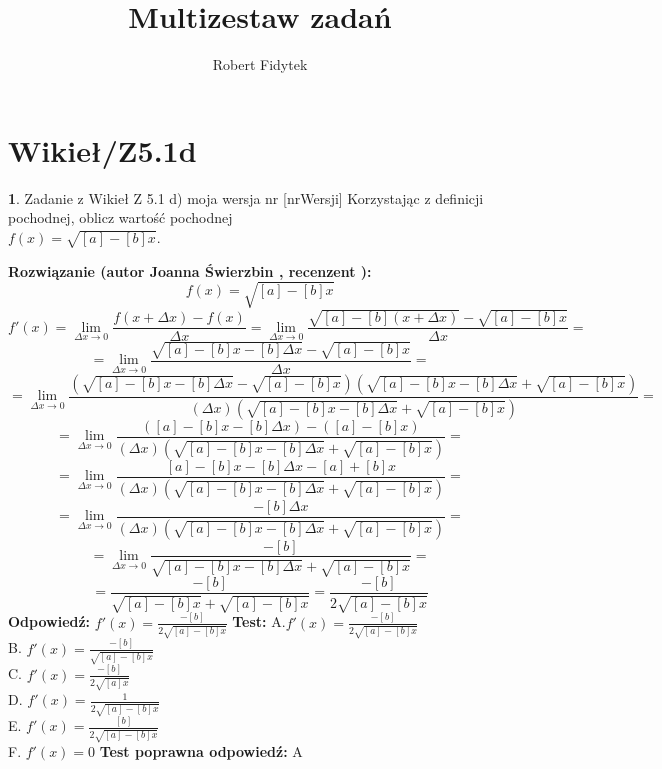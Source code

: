 \documentclass[12pt, a4paper]{article}
\title{Multizestaw zadań}
\author{Robert Fidytek}
\date{}
\theoremstyle{definition} %
\newtheorem{zad}{}
\newcommand{\kategoria}[1]{\section{#1}} %
\newcommand{\zadStart}[1]{\begin{zad}#1\newline} %
\newcommand{\zadStop}{\end{zad}}   %
\newcommand{\rozwStart}[2]{\noindent \textbf{Rozwiązanie (autor #1 , recenzent #2): }\newline} %
\newcommand{\rozwStop}{\newline}                                            %
\newcommand{\odpStart}{\noindent \textbf{Odpowiedź:}\newline}    %
\newcommand{\odpStop}{\newline}                                             %
\newcommand{\testStart}{\noindent \textbf{Test:}\newline} %
\newcommand{\testStop}{\newline} %
\newcommand{\kluczStart}{\noindent \textbf{Test poprawna odpowiedź:}\newline} %
\newcommand{\kluczStop}{\newline} %
\begin{document}
\maketitle


\kategoria{Wikieł/Z5.1d}
\zadStart{Zadanie z Wikieł Z 5.1 d) moja wersja nr [nrWersji]}
Korzystając z definicji pochodnej, oblicz wartość pochodnej \\ $f(x)=\sqrt{[a]-[b]x} $.
\zadStop
\rozwStart{Joanna Świerzbin}{}
$$f(x)=\sqrt{[a]-[b]x}$$
$$f'(x)=\lim_{\Delta x \rightarrow 0} \frac{f(x+\Delta x)-f(x)}{\Delta x} = \lim_{\Delta x \rightarrow 0} \frac{\sqrt{[a]-[b](x+\Delta x)}-\sqrt{[a]-[b]x}}{\Delta x}= $$
$$= \lim_{\Delta x \rightarrow 0} \frac{\sqrt{[a]-[b]x-[b]\Delta x}-\sqrt{[a]-[b]x}}{\Delta x}= $$ $$=
 \lim_{\Delta x \rightarrow 0} \frac{(\sqrt{[a]-[b]x-[b]\Delta x}-\sqrt{[a]-[b]x})(\sqrt{[a]-[b]x-[b]\Delta x}+\sqrt{[a]-[b]x})}{(\Delta x)(\sqrt{[a]-[b]x-[b]\Delta x}+\sqrt{[a]-[b]x})}= $$
$$= \lim_{\Delta x \rightarrow 0} \frac{([a]-[b]x-[b]\Delta x)-([a]-[b]x)}{(\Delta x)(\sqrt{[a]-[b]x-[b]\Delta x}+\sqrt{[a]-[b]x})}= $$ $$=
\lim_{\Delta x \rightarrow 0} \frac{[a]-[b]x-[b]\Delta x-[a]+[b]x}{(\Delta x)(\sqrt{[a]-[b]x-[b]\Delta x}+\sqrt{[a]-[b]x})}= $$
$$=\lim_{\Delta x \rightarrow 0} \frac{-[b]\Delta x}{(\Delta x)(\sqrt{[a]-[b]x-[b]\Delta x}+\sqrt{[a]-[b]x})}= $$
$$=\lim_{\Delta x \rightarrow 0} \frac{-[b]}{\sqrt{[a]-[b]x-[b]\Delta x}+\sqrt{[a]-[b]x}}= $$
$$=\frac{-[b]}{\sqrt{[a]-[b]x}+\sqrt{[a]-[b]x}}= \frac{-[b]}{2\sqrt{[a]-[b]x}} $$
\rozwStop
\odpStart
$f'(x)= \frac{-[b]}{2\sqrt{[a]-[b]x}}$
\odpStop
\testStart
A.$f'(x)= \frac{-[b]}{2\sqrt{[a]-[b]x}}$\\
B. $f'(x)=\frac{-[b]}{\sqrt{[a]-[b]x}}$ \\
C. $f'(x)= \frac{-[b]}{2\sqrt{[a]x}}$  \\
D. $f'(x)= \frac{1}{2\sqrt{[a]-[b]x}}$\\
E. $f'(x)= \frac{[b]}{2\sqrt{[a]-[b]x}}$\\
F. $f'(x)= 0 $
\testStop
\kluczStart
A
\kluczStop
\end{document}
